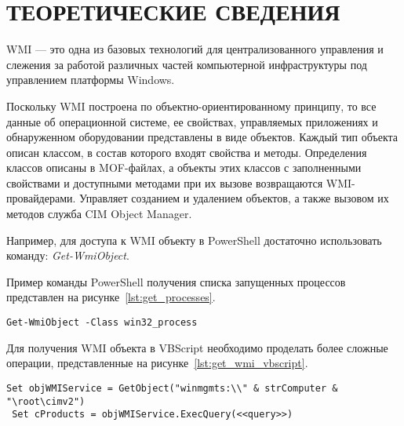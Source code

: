 \section{ТЕОРЕТИЧЕСКИЕ СВЕДЕНИЯ}

WMI --- это одна из базовых технологий для централизованного управления и
слежения за работой различных частей компьютерной инфраструктуры под
управлением платформы Windows.


Поскольку WMI построена по объектно-ориентированному принципу, то все данные
об операционной системе, ее свойствах, управляемых приложениях и
обнаруженном оборудовании представлены в виде объектов. Каждый тип объекта
описан классом, в состав которого входят свойства и методы.
Определения классов описаны в MOF-файлах, а объекты этих классов с заполненными
свойствами и доступными методами при их вызове возвращаются WMI-провайдерами.
Управляет созданием и удалением объектов, а также вызовом их методов
служба CIM Object Manager.

Например, для доступа к WMI объекту в PowerShell достаточно использовать команду:
\textit{Get-WmiObject}.

Пример команды PowerShell получения списка запущенных процессов
представлен на рисунке~\ref{lst:get_processes}.

\begin{lstlisting}[caption=Команда получения списка запущенных процессов,
label=lst:get_processes]
 Get-WmiObject -Class win32_process
\end{lstlisting}

Для получения WMI объекта в VBScript необходимо проделать более сложные операции,
представленные на рисунке~\ref{lst:get_wmi_vbscript}.

\begin{lstlisting}[caption=Команда получения объекта WMI в VBScript,
label=lst:get_wmi_vbscript,language=VBScript]
 Set objWMIService = GetObject("winmgmts:\\" & strComputer & "\root\cimv2")
 Set cProducts = objWMIService.ExecQuery(<<query>>)
\end{lstlisting}

\newpage
